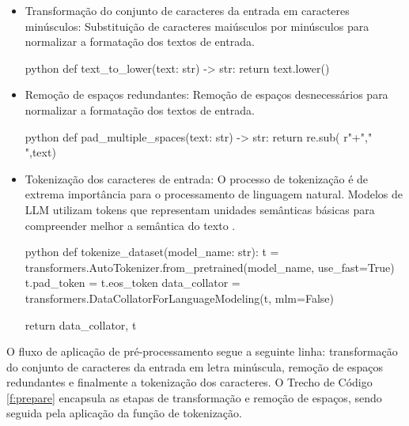 \begin{itemize}
    \item Transformação do conjunto de caracteres da entrada em caracteres minúsculos: Substituição de caracteres maiúsculos por minúsculos para normalizar a formatação dos textos de entrada.
    \begin{code}
    \label{f:min}
    \begin{mintedbox}{python}
    def text_to_lower(text: str) -> str:
        return text.lower()
    \end{mintedbox}
    \end{code}

    \item Remoção de espaços redundantes: Remoção de espaços desnecessários para normalizar a formatação dos textos de entrada.
    \begin{code}
    \label{f:rem}
    \begin{mintedbox}{python}
    def pad_multiple_spaces(text: str) -> str:
        return re.sub( r"\s+"," ",text)
    \end{mintedbox}
    \end{code}

    \item Tokenização dos caracteres de entrada: O processo de tokenização é de extrema importância para o processamento de linguagem natural. Modelos de LLM utilizam tokens que representam unidades semânticas básicas para compreender melhor a semântica do texto \cite{toraman}.
    \begin{code}
    \label{f:tokenization}
    \begin{mintedbox}{python}
    def tokenize_dataset(model_name: str):
        t = transformers.AutoTokenizer.from_pretrained(model_name, use_fast=True)
        t.pad_token = t.eos_token
        data_collator = transformers.DataCollatorForLanguageModeling(t, mlm=False)
    
        return data_collator, t
    \end{mintedbox}
    \end{code}
\end{itemize}

O fluxo de aplicação de pré-processamento segue a seguinte linha: transformação do conjunto de caracteres da entrada em letra minúscula, remoção de espaços redundantes e finalmente a tokenização dos caracteres. O Trecho de Código \ref{f:prepare} encapsula as etapas de transformação e remoção de espaços, sendo seguida pela aplicação da função de tokenização.

